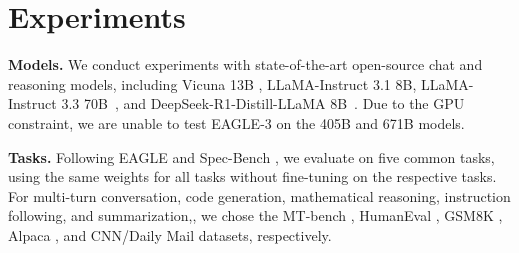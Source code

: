 \documentclass[11pt]{article}
\begin{document}


\section{Experiments}

\textbf{Models.} We conduct experiments with state-of-the-art open-source chat and reasoning models, including Vicuna 13B  \cite{vicuna2023}, LLaMA-Instruct 3.1 8B, LLaMA-Instruct 3.3 70B~\cite{dubey2024llama}, and DeepSeek-R1-Distill-LLaMA 8B~\cite{deepseek2025deepseek}. Due to the GPU constraint, we are unable to test EAGLE-3 on the 405B and 671B models.

\textbf{Tasks.} Following EAGLE \cite{li2024eagle} and Spec-Bench \cite{xia2024unlocking}, we evaluate on five common tasks, using the same weights for all tasks without fine-tuning on the respective tasks. For multi-turn conversation, code generation, mathematical reasoning, instruction following, and summarization,, we chose the MT-bench \cite{zheng2023judging}, HumanEval \cite{chen2021evaluating}, GSM8K \cite{cobbe2021training}, Alpaca \cite{alpaca}, and CNN/Daily Mail \cite{nallapati2016abstractive} datasets, respectively.
\end{document}
